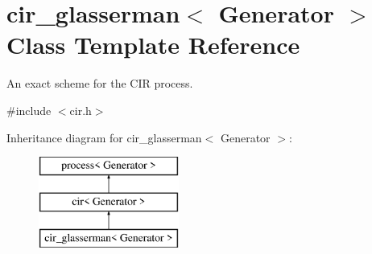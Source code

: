 \hypertarget{classcir__glasserman}{}\section{cir\+\_\+glasserman$<$ Generator $>$ Class Template Reference}
\label{classcir__glasserman}


An exact scheme for the C\+IR process.  




{\ttfamily \#include $<$cir.\+h$>$}

Inheritance diagram for cir\+\_\+glasserman$<$ Generator $>$\+:\begin{figure}[H]
\begin{center}
\leavevmode
\includegraphics[height=3.000000cm]{classcir__glasserman}
\end{center}
\end{figure}
